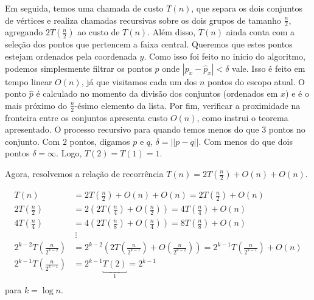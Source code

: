 \documentclass{homework}
\begin{document}
	Em seguida, temos uma chamada de custo {$T\left(n\right)$}, que separa os dois conjuntos de vértices e realiza chamadas recursivas sobre os dois grupos de tamanho $\frac{n}{2}$, agregando {$2 T\left(\frac{n}{2}\right)$} ao custo de $T\left(n\right)$. Além disso, $T\left(n\right)$ ainda conta com a seleção dos pontos que pertencem a faixa central. Queremos que estes pontos estejam ordenados pela coordenada $y$. Como isso foi feito no início do algoritmo, podemos simplesmente filtrar os pontos $p$ onde $|p_x - \hat{p}_x| < \delta$ vale. Isso é feito em tempo linear {$O\left(n\right)$}, já que visitamos cada um dos $n$ pontos do escopo atual. O ponto $\hat{p}$ é calculado no momento da divisão dos conjuntos (ordenados em $x$) e é o mais próximo do $\frac{n}{2}$-ésimo elemento da lista. Por fim, verificar a proximidade na fronteira entre os conjuntos apresenta custo {$O\left(n\right)$}, como instrui o teorema apresentado. O processo recursivo para quando temos menos do que $3$ pontos no conjunto. Com $2$ pontos, digamos $p$ e $q$, $\delta = ||p - q||.$ Com menos do que dois pontos $\delta = \infty$. Logo, {$T\left(2\right) = T\left(1\right) = 1$}. \par
	
	Agora, resolvemos a relação de recorrência  $T\left(n\right) = 2 T\left(\frac{n}{2}\right) + O\left(n\right) + O\left(n\right)$.\par
	
	\begin{align*}
		T\left(n\right) &= 2 T\left(\frac{n}{2}\right) + O\left(n\right) + O\left(n\right) = 2 T\left(\frac{n}{2}\right) + O\left(n\right) \\
		2 T\left(\frac{n}{2}\right) &= 2 \left(2 T\left(\frac{n}{4}\right) + O\left(\frac{n}{2}\right)\right) = 4 T\left(\frac{n}{4}\right) + O\left(n\right)\\
		4 T\left(\frac{n}{4}\right) &= 4 \left(2 T\left(\frac{n}{8}\right) + O\left(\frac{n}{4}\right)\right) = 8 T\left(\frac{n}{8}\right) + O\left(n\right)\\
		&~\vdots\\
		2^{k-2} T\left(\frac{n}{2^{k-2}}\right) &= 2^{k-2} \left(2 T\left(\frac{n}{2^{k-1}}\right) + O\left(\frac{n}{2^{k-2}}\right)\right) = 2^{k-1} T\left(\frac{n}{2^{k-1}}\right) + O\left(n\right)\\
		2^{k-1} T\left(\frac{n}{2^{k-1}}\right) &= 2^{k-1} \underbracket{T\left(2\right)}_{1} = 2^{k-1}\\
	\end{align*}
	para $k = \log n$. \par
	
\end{document}
